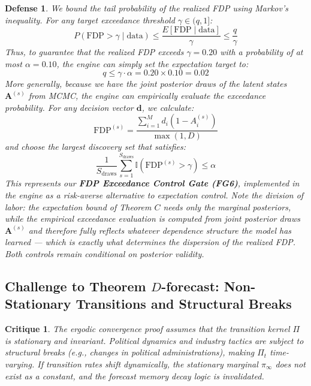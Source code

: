 \documentclass[11pt,a4paper]{article}
\newtheorem{critique}{Critique}
\newtheorem{defense}{Defense}
\begin{document}
\begin{defense}
We bound the tail probability of the realized FDP using Markov's inequality. For any target exceedance threshold $\gamma \in (q, 1]$:
\[
P(\text{FDP} > \gamma \mid \text{data}) \le \frac{E[\text{FDP} \mid \text{data}]}{\gamma} \le \frac{q}{\gamma}
\]
Thus, to guarantee that the realized FDP exceeds $\gamma = 0.20$ with a probability of at most $\alpha = 0.10$, the engine can simply set the expectation target to:
\[
q \le \gamma \cdot \alpha = 0.20 \times 0.10 = 0.02
\]
More generally, because we have the joint posterior draws of the latent states $\mathbf{A}^{(s)}$ from MCMC, the engine can empirically evaluate the exceedance probability. For any decision vector $\mathbf{d}$, we calculate:
\[
\text{FDP}^{(s)} = \frac{\sum_{i=1}^M d_i (1 - A_i^{(s)})}{\max(1, D)}
\]
and choose the largest discovery set that satisfies:
\[
\frac{1}{S_{\text{draws}}} \sum_{s=1}^{S_{\text{draws}}} \mathbb{I}(\text{FDP}^{(s)} > \gamma) \le \alpha
\]
This represents our \textbf{FDP Exceedance Control Gate (FG6)}, implemented in the engine as a risk-averse alternative to expectation control. Note the division of labor: the expectation bound of Theorem $C$ needs only the marginal posteriors, while the empirical exceedance evaluation is computed from \emph{joint} posterior draws $\mathbf{A}^{(s)}$ and therefore fully reflects whatever dependence structure the model has learned --- which is exactly what determines the dispersion of the realized FDP. Both controls remain conditional on posterior validity. %
\end{defense}

\subsection{Challenge to Theorem $D$-forecast: Non-Stationary Transitions and Structural Breaks}
\begin{critique}
The ergodic convergence proof assumes that the transition kernel $\Pi$ is stationary and invariant. Political dynamics and industry tactics are subject to structural breaks (e.g., changes in political administrations), making $\Pi_t$ time-varying. If transition rates shift dynamically, the stationary marginal $\pi_\infty$ does not exist as a constant, and the forecast memory decay logic is invalidated.
\end{critique}
\end{document}
